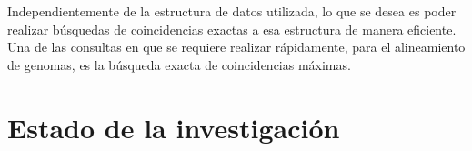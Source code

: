 \documentclass[12pt,a4paper]{article}
\begin{document}
\indent
Independientemente de la estructura de datos utilizada, lo que se desea es poder
realizar búsquedas de coincidencias exactas a esa estructura de manera eficiente. 
Una de las consultas en que se requiere realizar rápidamente, para el alineamiento 
de genomas, es la búsqueda exacta de coincidencias máximas. 
\section{Estado de la investigación}
\end{document}
